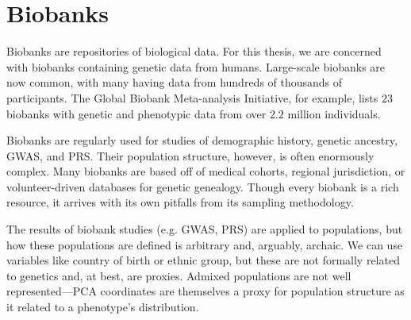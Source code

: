 

\section{Biobanks}

Biobanks are repositories of biological data. For this thesis, we are concerned with biobanks containing genetic data from humans. Large-scale biobanks are now common, with many having data from hundreds of thousands of participants. The Global Biobank Meta-analysis Initiative, for example, lists $23$ biobanks with genetic and phenotypic data from over $2.2$ million individuals\citep{zhou_global_2022}.

Biobanks are regularly used for studies of demographic history, genetic ancestry, GWAS, and PRS. Their population structure, however, is often enormously complex. Many biobanks are based off of medical cohorts, regional jurisdiction, or volunteer-driven databases for genetic genealogy. Though every biobank is a rich resource, it arrives with its own pitfalls from its sampling methodology.

The results of biobank studies (e.g. GWAS, PRS) are applied to populations, but how these populations are defined is arbitrary and, arguably, archaic. We can use variables like country of birth or ethnic group, but these are not formally related to genetics and, at best, are proxies. Admixed populations are not well represented---PCA coordinates are themselves a proxy for population structure as it related to a phenotype's distribution.






